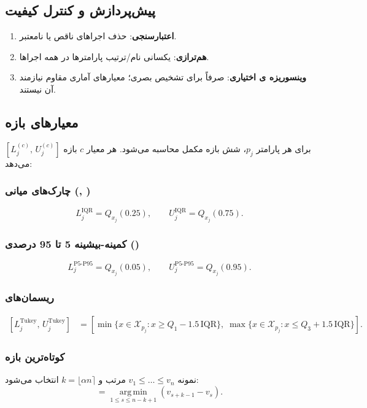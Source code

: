 \subsection{پیش‌پردازش و کنترل کیفیت}
\begin{enumerate}[label=\textbf{P\arabic*}]
    \item \textbf{اعتبارسنجی}: حذف اجراهای ناقص یا نامعتبر.
    \item \textbf{هم‌ترازی}: یکسانی نام/ترتیب پارامترها در همه اجراها.
    \item \textbf{وینسوریزه ی اختیاری}: صرفاً برای تشخیص بصری؛ معیارهای آماری مقاوم نیازمند آن نیستند.
\end{enumerate}

\subsection{معیارهای بازه}
برای هر پارامتر $p_j$، شش بازه مکمل محاسبه می‌شود. هر معیار $c$ بازه $[L^{(c)}_j,\,U^{(c)}_j]$ می‌دهد:
\subsubsection{چارک‌های میانی (, )}
\begin{equation}
 L^{\text{IQR}}_j = Q_{x_j}(0.25), \qquad U^{\text{IQR}}_j = Q_{x_j}(0.75).
\end{equation}
\subsubsection{کمینه-بیشینه 5 تا 95 درصدی ()}
\begin{equation}
 L^{\text{P5-P95}}_j = Q_{x_j}(0.05), \qquad U^{\text{P5-P95}}_j = Q_{x_j}(0.95).
\end{equation}
\subsubsection{ریسمان‌های }
\begin{align}
 \left[ L^{\text{Tukey}}_j,\, U^{\text{Tukey}}_j \right] &= \left[
 \min\{ x \in \mathcal{X}_{p_j} : x \ge Q_1 - 1.5\,\mathrm{IQR} \},\;
 \max\{ x \in \mathcal{X}_{p_j} : x \le Q_3 + 1.5\,\mathrm{IQR} \}
 \right].
\end{align}
\subsubsection{کوتاه‌ترین بازه }
نمونه $v_1\le\dots\le v_n$ مرتب و $k=\lfloor \alpha n \rceil$ انتخاب می‌شود:
\begin{equation}
 [L^{\text{HDI}}_j, U^{\text{HDI}}_j] = \operatorname*{arg\,min}_{1\le s\le n-k+1} (v_{s+k-1}-v_s).
\end{equation}
